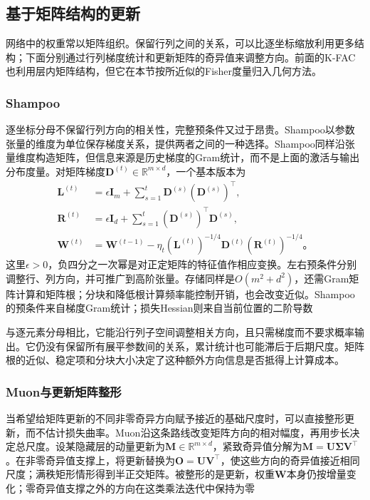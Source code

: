 \subsection{基于矩阵结构的更新}
\label{sec:training-matrix-updates}

网络中的权重常以矩阵组织。保留行列之间的关系，可以比逐坐标缩放利用更多结构；下面分别通过行列梯度统计和更新矩阵的奇异值来调整方向。前面的K-FAC也利用层内矩阵结构，但它在本节按所近似的Fisher度量归入几何方法。

\subsubsection{Shampoo}
\label{sec:training-shampoo}

逐坐标分母不保留行列方向的相关性，完整预条件又过于昂贵。Shampoo以参数张量的维度为单位保存梯度关系，提供两者之间的一种选择。Shampoo同样沿张量维度构造矩阵，但信息来源是历史梯度的Gram统计，而不是上面的激活与输出分布度量。对矩阵梯度$\bm D^{(t)}\in\mathbb R^{m\times d}$，一个基本版本为
\begin{align}
  \bm L^{(t)}&=\epsilon\bm I_m+\sum_{s=1}^t\bm D^{(s)}(\bm D^{(s)})^{\top},\\
  \bm R^{(t)}&=\epsilon\bm I_d+\sum_{s=1}^t(\bm D^{(s)})^{\top}\bm D^{(s)},\\
  \bm W^{(t)}&=\bm W^{(t-1)}-
    \eta_t(\bm L^{(t)})^{-1/4}\bm D^{(t)}(\bm R^{(t)})^{-1/4}\text{。}
  \label{eq:training-shampoo}
\end{align}
这里$\epsilon>0$，负四分之一次幂是对正定矩阵的特征值作相应变换。左右预条件分别调整行、列方向，并可推广到高阶张量。存储同样是$O(m^2+d^2)$，还需Gram矩阵计算和矩阵根；分块和降低根计算频率能控制开销，也会改变近似。Shampoo的预条件来自梯度Gram统计；损失Hessian则来自当前位置的二阶导数

与逐元素分母相比，它能沿行列子空间调整相关方向，且只需梯度而不要求概率输出。它仍没有保留所有展平参数间的关系，累计统计也可能滞后于后期尺度。矩阵根的近似、稳定项和分块大小决定了这种额外方向信息是否抵得上计算成本。

\subsubsection{Muon与更新矩阵整形}
\label{sec:training-muon}

当希望给矩阵更新的不同非零奇异方向赋予接近的基础尺度时，可以直接整形更新，而不估计损失曲率。Muon沿这条路线改变矩阵方向的相对幅度，再用步长决定总尺度。设某隐藏层的动量更新为$\bm M\in\mathbb R^{m\times d}$，紧致奇异值分解为$\bm M=\bm U\bm\Sigma\bm V^{\top}$。在非零奇异值支撑上，将更新替换为$\bm O=\bm U\bm V^{\top}$，使这些方向的奇异值接近相同尺度；满秩矩形情形得到半正交矩阵。被整形的是更新，权重$\bm W$本身仍按增量变化；零奇异值支撑之外的方向在这类乘法迭代中保持为零

